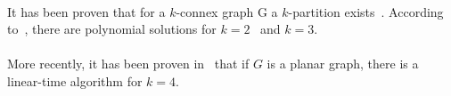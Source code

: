 \paragraph{}
It has been proven that for a $k$-connex graph G a $k$-partition
exists~\cite{GE78,LL77}.
According to~\cite{JS94}, there are polynomial solutions for
$k=2$~\cite{GE78,LL77} and $k=3$.

\paragraph{}
More recently, it has been proven in~\cite{Nakano1997315} that if $G$ is a planar graph, there is a linear-time algorithm for $k = 4$.




